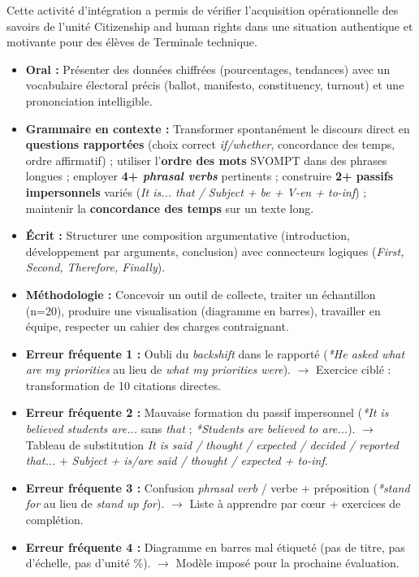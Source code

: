 \documentclass[11pt]{article}
\newcommand{\cle}[1]{{\popxbold\color{popdark}#1}}
\newcounter{popsec}
\newcounter{popsub}
\newcommand{\courssub}[1]{%
  \stepcounter{popsub}%
  \par\vspace{9pt}\noindent{\popxbold\fontsize{11.5}{13}\selectfont\color{popink}{\color{poporange}\thepopsec.\thepopsub}\hspace{6pt}#1}\par\nopagebreak\vspace{4pt}
}
\begin{document}
\courssub{Bilan de l'activité}
Cette activité d'intégration a permis de vérifier l'acquisition opérationnelle des savoirs de l'unité \cle{Citizenship and human rights} dans une situation authentique et motivante pour des élèves de Terminale technique.

\begin{aretenir}
\begin{itemize}
    \item \textbf{Oral :} Présenter des données chiffrées (pourcentages, tendances) avec un vocabulaire électoral précis (\cle{ballot}, \cle{manifesto}, \cle{constituency}, \cle{turnout}) et une prononciation intelligible.
    \item \textbf{Grammaire en contexte :} Transformer spontanément le discours direct en \textbf{questions rapportées} (choix correct \emph{if/whether}, concordance des temps, ordre affirmatif) ; utiliser l'\textbf{ordre des mots} SVOMPT dans des phrases longues ; employer \textbf{4+ \emph{phrasal verbs}} pertinents ; construire \textbf{2+ passifs impersonnels} variés (\emph{It is... that / Subject + be + V-en + to-inf}) ; maintenir la \textbf{concordance des temps} sur un texte long.
    \item \textbf{Écrit :} Structurer une composition argumentative (introduction, développement par arguments, conclusion) avec connecteurs logiques (\emph{First, Second, Therefore, Finally}).
    \item \textbf{Méthodologie :} Concevoir un outil de collecte, traiter un échantillon (n=20), produire une visualisation (diagramme en barres), travailler en équipe, respecter un cahier des charges contraignant.
\end{itemize}
\end{aretenir}

\begin{attention}
\begin{itemize}
    \item \textbf{Erreur fréquente 1 :} Oubli du \emph{backshift} dans le rapporté (\emph{*He asked what are my priorities} au lieu de \emph{what my priorities were}). $\to$ Exercice ciblé : transformation de 10 citations directes.
    \item \textbf{Erreur fréquente 2 :} Mauvaise formation du passif impersonnel (\emph{*It is believed students are...} sans \emph{that} ; \emph{*Students are believed to are...}). $\to$ Tableau de substitution \emph{It is said / thought / expected / decided / reported that...} + \emph{Subject + is/are said / thought / expected + to-inf}.
    \item \textbf{Erreur fréquente 3 :} Confusion \emph{phrasal verb} / verbe + préposition (\emph{*stand for} au lieu de \emph{stand up for}). $\to$ Liste à apprendre par cœur + exercices de complétion.
    \item \textbf{Erreur fréquente 4 :} Diagramme en barres mal étiqueté (pas de titre, pas d'échelle, pas d'unité \%). $\to$ Modèle imposé pour la prochaine évaluation.
\end{itemize}
\end{attention}
\end{document}
